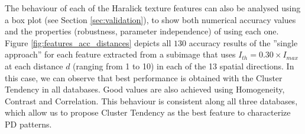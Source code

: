 The behaviour of each of the Haralick texture features can also be analysed using a box plot (see Section \ref{sec:validation}), to show both numerical accuracy values and the properties (robustness, parameter independence) of using each one. Figure \ref{fig:features_acc_distances} depicts all $130$ accuracy results of the ''single approach'' for each feature extracted from a subimage that uses $I_{th}=0.30\times I_{max}$ at each distance $d$ (ranging from 1 to 10) in each of the 13 spatial directions. In this case, we can observe that best performance is obtained with the Cluster Tendency in all databases. Good values are also achieved using Homogeneity, Contrast and Correlation. This behaviour is consistent along all three databases, which allow us to propose Cluster Tendency as the best feature to characterize PD patterns. 

